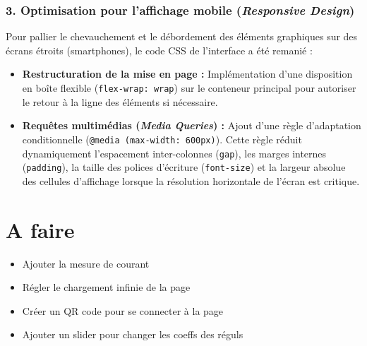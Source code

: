 \subsubsection*{3. Optimisation pour l'affichage mobile (\textit{Responsive Design})}
Pour pallier le chevauchement et le débordement des éléments graphiques sur des écrans étroits (smartphones), le code CSS de l'interface a été remanié :
\begin{itemize}
  \item \textbf{Restructuration de la mise en page :} Implémentation d'une disposition en boîte flexible (\texttt{flex-wrap: wrap}) sur le conteneur principal pour autoriser le retour à la ligne des éléments si nécessaire.
  \item \textbf{Requêtes multimédias (\textit{Media Queries}) :} Ajout d'une règle d'adaptation conditionnelle (\texttt{@media (max-width: 600px)}). Cette règle réduit dynamiquement l'espacement inter-colonnes (\texttt{gap}), les marges internes (\texttt{padding}), la taille des polices d'écriture (\texttt{font-size}) et la largeur absolue des cellules d'affichage lorsque la résolution horizontale de l'écran est critique.
\end{itemize}

\section{A faire}
\begin{itemize}
  \item Ajouter la mesure de courant
  \item Régler le chargement infinie de la page
  \item Créer un QR code pour se connecter à la page
  \item Ajouter un slider pour changer les coeffs des réguls
\end{itemize}
